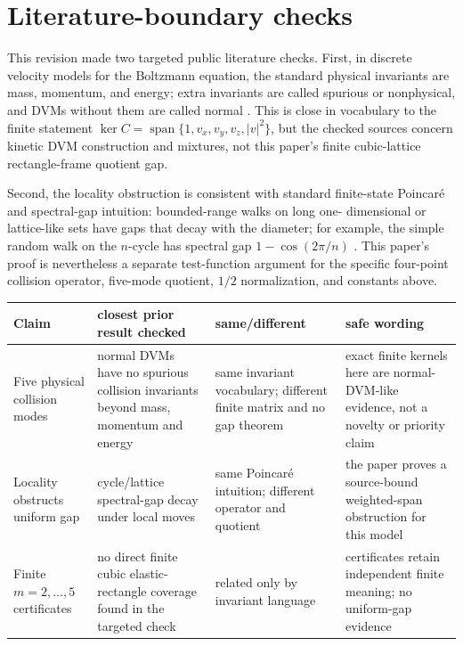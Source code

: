 \documentclass[11pt]{article}
\theoremstyle{definition}
\theoremstyle{remark}
\begin{document}
\section{Literature-boundary checks}\label{sec:literature}

This revision made two targeted public literature checks.  First, in discrete
velocity models for the Boltzmann equation, the standard physical invariants
are mass, momentum, and energy; extra invariants are called spurious or
nonphysical, and DVMs without them are called normal
\cite{BobylevCercignani1999DVM,BernhoffVinerean2016Mixtures}.  This is close
in vocabulary to the finite statement $\ker C=\operatorname{span}\{1,v_x,v_y,
v_z,|v|^2\}$, but the checked sources concern kinetic DVM construction and
mixtures, not this paper's finite cubic-lattice rectangle-frame quotient gap.

Second, the locality obstruction is consistent with standard finite-state
Poincar\'e and spectral-gap intuition: bounded-range walks on long one-
dimensional or lattice-like sets have gaps that decay with the diameter; for
example, the simple random walk on the $n$-cycle has spectral gap
$1-\cos(2\pi/n)$ \cite{GoelMontenegroTetali2006SpectralProfile}.  This paper's
proof is nevertheless a separate test-function argument for the specific
four-point collision operator, five-mode quotient, $1/2$ normalization, and
constants above.

\begin{center}
\small
\begin{tabular}{@{}p{}p{}p{}p{}@{}}
\toprule
Claim & closest prior result checked & same/different & safe wording \\
\midrule
Five physical collision modes & normal DVMs have no spurious collision
invariants beyond mass, momentum and energy & same invariant vocabulary;
different finite matrix and no gap theorem & exact finite kernels here are
normal-DVM-like evidence, not a novelty or priority claim \\
Locality obstructs uniform gap & cycle/lattice spectral-gap decay under
local moves & same Poincar\'e intuition; different operator and quotient &
the paper proves a source-bound weighted-span obstruction for this model \\
Finite $m=2,\ldots,5$ certificates & no direct finite cubic elastic-rectangle
coverage found in the targeted check & related only by invariant language &
certificates retain independent finite meaning; no uniform-gap evidence \\
\bottomrule
\end{tabular}
\end{center}
\end{document}
